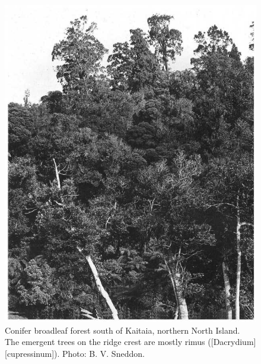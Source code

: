 \begin{figure}[htb]
	\centering
	\begin{minipage}[t]{0.4\textwidth}
		\centering
		\includegraphics[width=\textwidth]{graphics/figure7conifer.jpg}
    	\caption[Conifer broadleaf forest south of Kaitaia]{Conifer broadleaf forest south of Kaitaia, northern North Island.
        The emergent trees on the ridge crest are mostly rimus ([Dacrydium][cupressinum]).
    	Photo: B. V. Sneddon.}%
    	\label{fig:7conifer}
	\end{minipage}\hfill%
	\begin{minipage}[t]{0.55\textwidth}
    	\centering

\end{minipage}
\end{figure}
